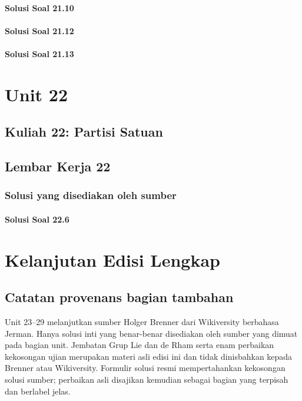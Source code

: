 \documentclass[11pt,a4paper,oneside]{book}
\begin{document}
\subsection*{Solusi Soal 21.10}

\subsection*{Solusi Soal 21.12}

\subsection*{Solusi Soal 21.13}


\part{Unit 22}
\chapter[Kuliah 22]{Kuliah 22: Partisi Satuan}


\chapter{Lembar Kerja 22}


\section*{Solusi yang disediakan oleh sumber}
\subsection*{Solusi Soal 22.6}


\part{Kelanjutan Edisi Lengkap}
\chapter*{Catatan provenans bagian tambahan}
Unit 23--29 melanjutkan sumber Holger Brenner dari Wikiversity berbahasa Jerman. Hanya solusi inti yang benar-benar disediakan oleh sumber yang dimuat pada bagian unit. Jembatan Grup Lie dan de Rham serta enam perbaikan kekosongan ujian merupakan materi asli edisi ini dan tidak dinisbahkan kepada Brenner atau Wikiversity. Formulir solusi resmi mempertahankan kekosongan solusi sumber; perbaikan asli disajikan kemudian sebagai bagian yang terpisah dan berlabel jelas.
\newtheorem{Korolari}[fakt]{Korolari}
\newtheorem{Akibat}[fakt]{Akibat}
\end{document}

